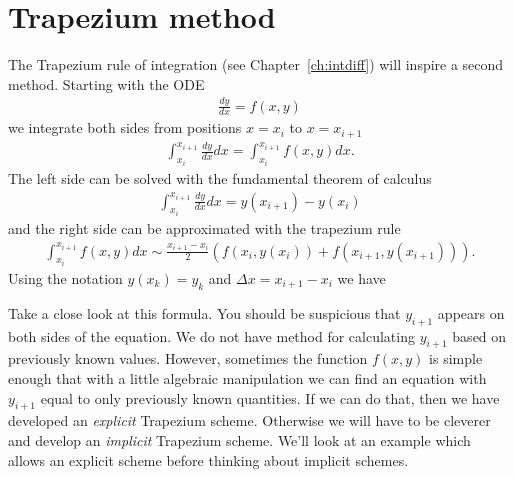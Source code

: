 \section{Trapezium method}
The Trapezium rule of integration (see Chapter~\ref{ch:intdiff}) will inspire a second method. Starting with the ODE
\begin{align*}
\frac{dy}{dx} = f(x,y)
\end{align*}
we integrate both sides from positions $x=x_i$ to $x=x_{i+1}$
\begin{align*}
\int_{x_i}^{x_{i+1}} \frac{dy}{dx} dx = \int_{x_i}^{x_{i+1}} f(x,y) dx.
\end{align*}
The left side can be solved with the fundamental theorem of calculus
\begin{align*}
\int_{x_i}^{x_{i+1}} \frac{dy}{dx} dx = y(x_{i+1}) - y(x_i)
\end{align*}
and the right side can be approximated with the trapezium rule
\begin{align*}
\int_{x_i}^{x_{i+1}} f(x,y) dx \sim \frac{x_{i+1} - x_{i}}{2} \left(f(x_i,y(x_i)) + f(x_{i+1},y(x_{i+1})) \right).
\end{align*}
Using the notation $y(x_k) = y_k$ and $\Delta x = x_{i+1} - x_{i}$ we have

\vspace{0.2cm}
\noindent {}
\vspace{0.2cm}

\noindent Take a close look at this formula. You should be suspicious that $y_{i+1}$ appears on both sides of the equation. We do not have method for calculating $y_{i+1}$ based on previously known values. However, sometimes the function $f(x,y)$ is simple enough that with a little algebraic manipulation we can find an equation with $y_{i+1}$ equal to only previously known quantities. If we can do that, then we have developed an \textit{explicit} Trapezium scheme. Otherwise we will have to be cleverer and develop an \textit{implicit} Trapezium scheme. We'll look at an example which allows an explicit scheme before thinking about implicit schemes.

